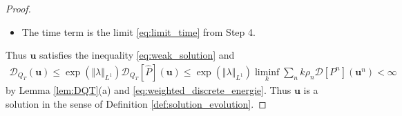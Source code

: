 \documentclass{article}
\theoremstyle{definition}
\newcommand{\bfu}{\boldsymbol{u}}
\newcommand{\D}{\mathcal{D}}
\begin{document}
\begin{proof}
\begin{itemize}
\begin{align*}
            \liminf_k \D_{Q_T}[\hat P](\bar\bfu_k)&\geq \D_{Q_T}[\hat P](\bfu) \ ,
        \end{align*}
        and with this we have
        \begin{align*}
            \limsup_k \Big(-\sum_n k\rho_n\D[P^n](\bfu^n)\Big) \leq -\D_{Q_T}[\hat P](\bfu) \ .
        \end{align*}
        \item The time term is the limit \eqref{eq:limit_time} from Step 4.
    \end{itemize}
    Thus $\bfu$ satisfies the inequality \eqref{eq:weak_solution} and
    \begin{align*}
        \D_{Q_T}(\bfu) \leq \exp(\Vert\lambda\Vert_{L^1})\D_{Q_T}[\hat P](\bfu)
        \leq \exp(\Vert\lambda\Vert_{L^1})\liminf_k\sum_n k \rho_n\D[P^n](\bfu^n)
        <\infty
    \end{align*}
    by Lemma \ref{lem:DQT}(a) and \eqref{eq:weighted_discrete_energie}.
    Thus $\bfu$ is a solution in the sense of Definition \ref{def:solution_evolution}.


\end{proof}
\end{document}
